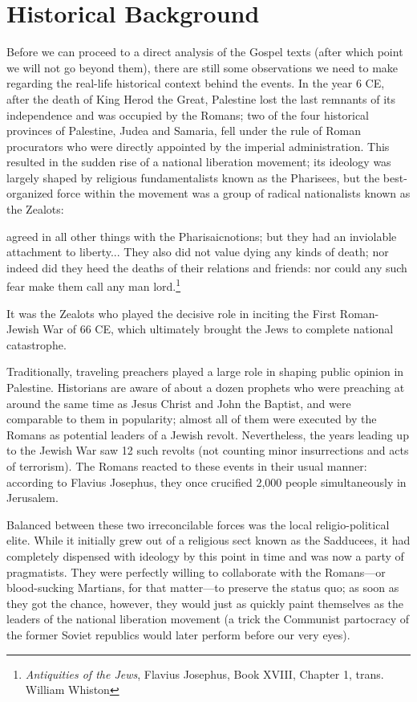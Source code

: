 \chapter*{Historical Background}

Before we can proceed to a direct analysis of the Gospel texts (after which point we will not go beyond them), there are still some observations we need to make regarding the real-life historical context behind the events. In the year 6 CE, after the death of King Herod the Great, Palestine lost the last remnants of its independence and was occupied by the Romans; two of the four historical provinces of Palestine, Judea and Samaria, fell under the rule of Roman procurators who were directly appointed by the imperial administration. This resulted in the sudden rise of a national liberation movement; its ideology was largely shaped by religious fundamentalists known as the Pharisees, but the best-organized force within the movement was a group of radical nationalists known as the Zealots:

\begin{smallquote}
     agreed in all other things with the Pharisaicnotions; but they had an inviolable attachment to liberty... They also did not value dying any kinds of death; nor indeed did they heed the deaths of their relations and friends: nor could any such fear make them call any man lord.\footnote{\emph{Antiquities of the Jews}, Flavius Josephus, Book XVIII, Chapter 1, trans. William Whiston}
\end{smallquote}
It was the Zealots who played the decisive role in inciting the First Roman-Jewish
War of 66 CE, which ultimately brought the Jews to complete national catastrophe.

Traditionally, traveling preachers played a large role in shaping public opinion in Palestine. Historians are aware of about a dozen prophets who were preaching at around the same time as Jesus Christ and John the Baptist, and were comparable to them in popularity; almost all of them were executed by the Romans as potential leaders of a Jewish revolt. Nevertheless, the years leading up to the Jewish War saw 12 such revolts (not counting minor insurrections and acts of terrorism). The Romans reacted to these events in their usual manner: according to Flavius Josephus, they once crucified 2,000 people simultaneously in Jerusalem.

Balanced between these two irreconcilable forces was the local religio-political elite. While it initially grew out of a religious sect known as the Sadducees, it had completely dispensed with ideology by this point in time and was now a party of pragmatists. They were perfectly willing to collaborate with the Romans---or blood-sucking Martians, for that matter---to preserve the status quo; as soon as they got the chance, however, they would just as quickly paint themselves as the leaders of the national liberation movement (a trick the Communist partocracy of the former Soviet republics would later perform before our very eyes).

